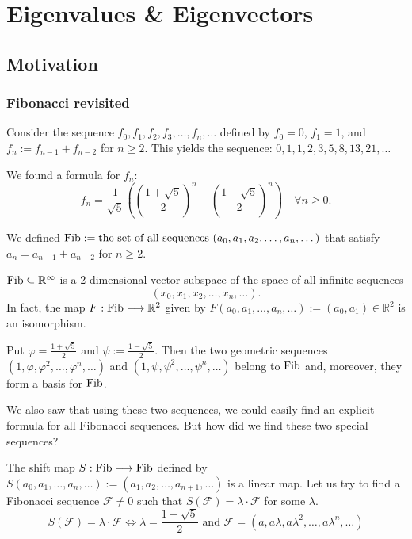 \setcounter{chapter}{20} %
\chapter{Eigenvalues \& Eigenvectors}

\section{Motivation}

\subsection{Fibonacci revisited}
Consider the sequence $f_0, f_1, f_2, f_3, \dots, f_n, \dots$ defined by $f_0 = 0$, $f_1 = 1$, and $f_n := f_{n-1} + f_{n-2}$ for $n \ge 2$.
This yields the sequence: $0, 1, 1, 2, 3, 5, 8, 13, 21, \dots$

We found a formula for $f_n$:
\[ f_n = \frac{1}{\sqrt{5}} \left( \left(\frac{1+\sqrt{5}}{2}\right)^n - \left(\frac{1-\sqrt{5}}{2}\right)^n \right) \quad \forall n \ge 0. \]

We defined $\operatorname{Fib} := \text{the set of all sequences } (a_0, a_1, a_2, \dots, a_n, \dots)$ that satisfy $a_n = a_{n-1} + a_{n-2}$ for $n \ge 2$.

\begin{claim*}\label{claim:fib_subspace}
  $\operatorname{Fib} \subseteq \mathbb{R}^{\infty}$ is a 2-dimensional vector subspace of the space of all infinite sequences \[(x_0, x_1, x_2, \dots, x_n, \dots).\]
  In fact, the map $F : \operatorname{Fib} \longrightarrow \mathbb{R}^2$ given by $F(a_0, a_1, \dots, a_n, \dots) := (a_0, a_1) \in \mathbb{R}^2$ is an isomorphism.
\end{claim*}

\begin{claim*}\label{claim:fib_basis}
  Put $\varphi = \frac{1+\sqrt{5}}{2}$ and $\psi := \frac{1-\sqrt{5}}{2}$. Then the two geometric sequences $(1, \varphi, \varphi^2, \dots, \varphi^n, \dots)$ and $(1, \psi, \psi^2, \dots, \psi^n, \dots)$ belong to $\operatorname{Fib}$ and, moreover, they form a basis for $\operatorname{Fib}$.
\end{claim*}

We also saw that using these two sequences, we could easily find an explicit formula for all Fibonacci sequences. But how did we find these two special sequences?

The shift map $S : \operatorname{Fib} \longrightarrow \operatorname{Fib}$ defined by $S(a_0, a_1, \dots, a_n, \dots) := (a_1, a_2, \dots, a_{n+1}, \dots)$ is a linear map.
Let us try to find a Fibonacci sequence $\mathcal{F} \ne 0$ such that $S(\mathcal{F}) = \lambda \cdot \mathcal{F}$ for some $\lambda$.
\[ S(\mathcal{F}) = \lambda \cdot \mathcal{F} \iff \lambda = \frac{1\pm\sqrt{5}}{2} \text{ and } \mathcal{F} = (a, a\lambda, a\lambda^2, \dots, a\lambda^n, \dots) \]


